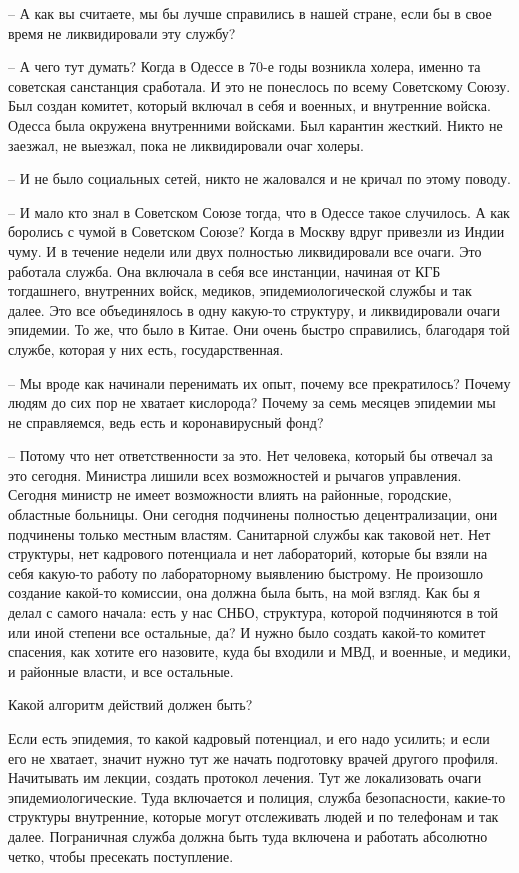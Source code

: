 – А как вы считаете, мы бы лучше справились в нашей стране, если бы в свое
время не ликвидировали эту службу?

– А чего тут думать? Когда в Одессе в 70-е годы возникла холера, именно та
советская санстанция сработала. И это не понеслось по всему Советскому Союзу.
Был создан комитет, который включал в себя и военных, и внутренние войска.
Одесса была окружена внутренними войсками. Был карантин жесткий. Никто не
заезжал, не выезжал, пока не ликвидировали очаг холеры. 

– И не было социальных сетей, никто не жаловался и не кричал по этому поводу.

– И мало кто знал в Советском Союзе тогда, что в Одессе такое случилось. А как
боролись с чумой в Советском Союзе? Когда в Москву вдруг привезли из Индии
чуму. И в течение недели или двух полностью ликвидировали все очаги. Это
работала служба. Она включала в себя все инстанции, начиная от КГБ тогдашнего,
внутренних войск, медиков, эпидемиологической службы и так далее. Это все
объединялось в одну какую-то структуру, и ликвидировали очаги эпидемии. То же,
что было в Китае. Они очень быстро справились, благодаря той службе, которая у
них есть, государственная. 

– Мы вроде как начинали перенимать их опыт, почему все прекратилось? Почему
людям до сих пор не хватает кислорода? Почему за семь месяцев эпидемии мы не
справляемся, ведь есть и коронавирусный фонд?

– Потому что нет ответственности за это. Нет человека, который бы отвечал за
это сегодня. Министра лишили всех возможностей и рычагов управления. Сегодня
министр не имеет возможности влиять на районные, городские, областные больницы.
Они сегодня подчинены полностью децентрализации, они подчинены только местным
властям. Санитарной службы как таковой нет. Нет структуры, нет кадрового
потенциала и нет лабораторий, которые бы взяли на себя какую-то работу по
лабораторному выявлению быстрому. Не произошло создание какой-то комиссии, она
должна была быть, на мой взгляд. Как бы я делал с самого начала: есть у нас
СНБО, структура, которой подчиняются в той или иной степени все остальные, да?
И нужно было создать какой-то комитет спасения, как хотите его назовите, куда
бы входили и МВД, и военные, и медики, и районные власти, и все остальные.

Какой алгоритм действий должен быть?

Если есть эпидемия, то какой кадровый потенциал, и его надо усилить; и если его
не хватает, значит нужно тут же начать подготовку врачей другого профиля.
Начитывать им лекции, создать протокол лечения. Тут же локализовать очаги
эпидемиологические. Туда включается и полиция, служба безопасности, какие-то
структуры внутренние, которые могут отслеживать людей и по телефонам и так
далее. Пограничная служба должна быть туда включена и работать абсолютно четко,
чтобы пресекать поступление.  

